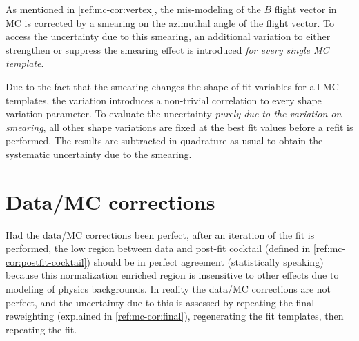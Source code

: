 As mentioned in \cref{ref:mc-cor:vertex},
the mis-modeling of the $B$ flight vector in MC is corrected by a smearing
on the azimuthal angle of the flight vector.
To access the uncertainty due to this smearing, an additional
variation to either strengthen or suppress the smearing effect is introduced
\emph{for every single MC template}.

Due to the fact that the smearing changes the shape of fit variables for all
MC templates, the variation introduces a non-trivial correlation to every
shape variation parameter.
To evaluate the uncertainty \emph{purely due to the variation on smearing},
all other shape variations are fixed at the best fit values before a refit is
performed.
The results are subtracted in quadrature as usual to obtain the systematic
uncertainty due to the smearing.


\section{Data/MC corrections}
\label{sys-cor-rwt}

Had the data/MC corrections been perfect,
after an iteration of the fit is performed,
the low \mmSq region between data and post-fit cocktail
(defined in \cref{ref:mc-cor:postfit-cocktail}) should be in perfect agreement
(statistically speaking)
because this normalization enriched region is insensitive to other effects
due to modeling of physics backgrounds.
In reality the data/MC corrections are not perfect,
and the uncertainty due to this is assessed by repeating
the final reweighting (explained in \cref{ref:mc-cor:final}),
regenerating the fit templates,
then repeating the fit.
